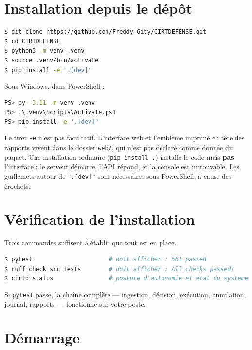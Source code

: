\section{Installation depuis le dépôt}

\begin{lstlisting}[language=bash]
$ git clone https://github.com/Freddy-Gity/CIRTDEFENSE.git
$ cd CIRTDEFENSE
$ python3 -m venv .venv
$ source .venv/bin/activate
$ pip install -e ".[dev]"
\end{lstlisting}

Sous Windows, dans PowerShell :

\begin{lstlisting}[language=bash]
PS> py -3.11 -m venv .venv
PS> .\.venv\Scripts\Activate.ps1
PS> pip install -e ".[dev]"
\end{lstlisting}

\begin{tcolorbox}[colback=orange!5!white, colframe=orange!70!black,
  title=\textbf{Attention --- installez en mode éditable}, fonttitle=\bfseries,
  boxrule=0.6pt]
Le tiret \texttt{-e} n'est pas facultatif. L'interface web et l'emblème
imprimé en tête des rapports vivent dans le dossier \texttt{web/}, qui n'est
pas déclaré comme donnée du paquet. Une installation ordinaire
(\texttt{pip install .}) installe le code mais \textbf{pas} l'interface : le
serveur démarre, l'API répond, et la console est introuvable. Les guillemets
autour de \texttt{".[dev]"} sont nécessaires sous PowerShell, à cause des
crochets.
\end{tcolorbox}

\section{Vérification de l'installation}

Trois commandes suffisent à établir que tout est en place.

\begin{lstlisting}[language=bash]
$ pytest                      # doit afficher : 561 passed
$ ruff check src tests        # doit afficher : All checks passed!
$ cirtd status                # posture d'autonomie et etat du systeme
\end{lstlisting}

Si \texttt{pytest} passe, la chaîne complète — ingestion, décision, exécution,
annulation, journal, rapports — fonctionne sur votre poste.

\section{Démarrage}

